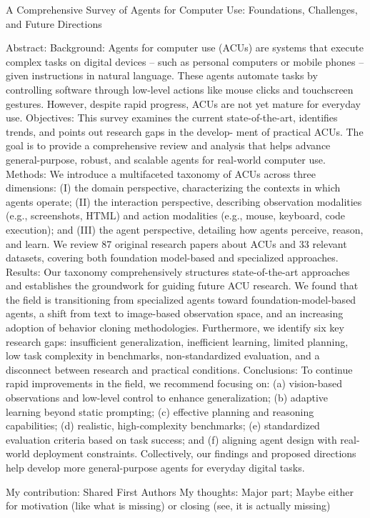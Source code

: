 A Comprehensive Survey of Agents for Computer Use: Foundations, Challenges, and Future Directions

Abstract: Background: Agents for computer use (ACUs) are systems that execute complex tasks on digital devices – such as personal
computers or mobile phones – given instructions in natural language. These agents automate tasks by controlling software
through low-level actions like mouse clicks and touchscreen gestures. However, despite rapid progress, ACUs are not yet
mature for everyday use.
Objectives: This survey examines the current state-of-the-art, identifies trends, and points out research gaps in the develop-
ment of practical ACUs. The goal is to provide a comprehensive review and analysis that helps advance general-purpose,
robust, and scalable agents for real-world computer use.
Methods: We introduce a multifaceted taxonomy of ACUs across three dimensions: (I) the domain perspective, characterizing
the contexts in which agents operate; (II) the interaction perspective, describing observation modalities (e.g., screenshots,
HTML) and action modalities (e.g., mouse, keyboard, code execution); and (III) the agent perspective, detailing how agents
perceive, reason, and learn. We review 87 original research papers about ACUs and 33 relevant datasets, covering both
foundation model-based and specialized approaches.
Results: Our taxonomy comprehensively structures state-of-the-art approaches and establishes the groundwork for guiding
future ACU research. We found that the field is transitioning from specialized agents toward foundation-model-based agents, a
shift from text to image-based observation space, and an increasing adoption of behavior cloning methodologies. Furthermore,
we identify six key research gaps: insufficient generalization, inefficient learning, limited planning, low task complexity in
benchmarks, non-standardized evaluation, and a disconnect between research and practical conditions.
Conclusions: To continue rapid improvements in the field, we recommend focusing on: (a) vision-based observations and
low-level control to enhance generalization; (b) adaptive learning beyond static prompting; (c) effective planning and reasoning
capabilities; (d) realistic, high-complexity benchmarks; (e) standardized evaluation criteria based on task success; and (f)
aligning agent design with real-world deployment constraints. Collectively, our findings and proposed directions help develop
more general-purpose agents for everyday digital tasks.

My contribution: Shared First Authors
My thoughts: Major part; Maybe either for motivation (like what is missing) or closing (see, it is actually missing)




